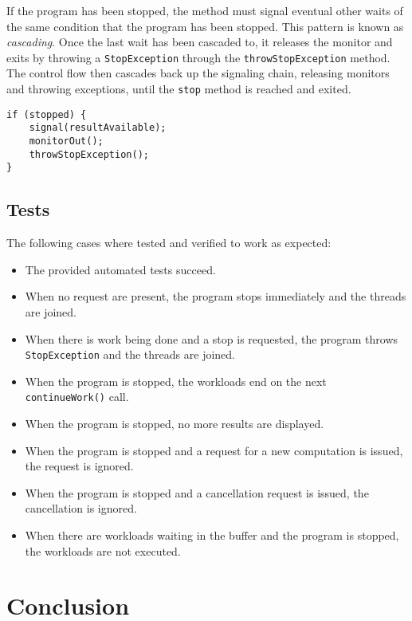 \documentclass{article}
\begin{document}
    If the program has been stopped, the method must signal eventual other waits of the same condition that the program has been stopped.
    This pattern is known as \textit{cascading}.
    Once the last wait has been cascaded to, it releases the monitor and exits by throwing a \texttt{StopException} through the \texttt{throwStopException} method.
    The control flow then cascades back up the signaling chain, releasing monitors and throwing exceptions, until the \texttt{stop} method is reached and exited.

    \begin{lstlisting}[caption={Excrept of the stop condition checking in the \texttt{ComputationManager::getNextResult()} method.}, captionpos=b, label=lst:1]
if (stopped) {
    signal(resultAvailable);
    monitorOut();
    throwStopException();
}
    \end{lstlisting}

    \subsection*{Tests}

    The following cases where tested and verified to work as expected:

    \begin{itemize}
        \item The provided automated tests succeed.
        \item When no request are present, the program stops immediately and the threads are joined.
        \item When there is work being done and a stop is requested, the program throws \texttt{StopException} and the threads are joined.
        \item When the program is stopped, the workloads end on the next \texttt{continueWork()} call.
        \item When the program is stopped, no more results are displayed.
        \item When the program is stopped and a request for a new computation is issued, the request is ignored.
        \item When the program is stopped and a cancellation request is issued, the cancellation is ignored.
        \item When there are workloads waiting in the buffer and the program is stopped, the workloads are not executed.
    \end{itemize}

    \section*{Conclusion}
\end{document}

